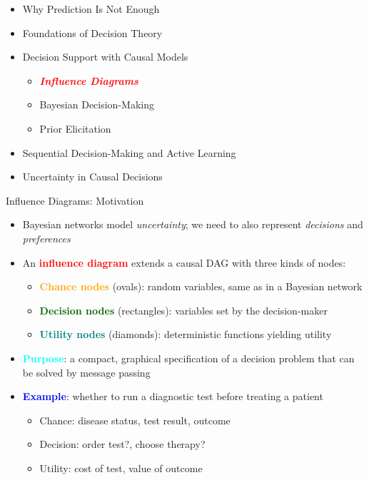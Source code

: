 \documentclass[
  10pt,
  ignorenonframetext,
]{beamer}
\providecommand{\tightlist}{%
  \setlength{\itemsep}{0pt}\setlength{\parskip}{0pt}}
\begin{document}
\begin{frame}{}
\label{section-9}
\begin{itemize}
\tightlist
\item
  Why Prediction Is Not Enough
\item
  Foundations of Decision Theory
\item
  Decision Support with Causal Models

  \begin{itemize}
  \tightlist
  \item
    \emph{\textbf{\textcolor{red}{Influence Diagrams}}}
  \item
    Bayesian Decision-Making
  \item
    Prior Elicitation
  \end{itemize}
\item
  Sequential Decision-Making and Active Learning
\item
  Uncertainty in Causal Decisions
\end{itemize}
\end{frame}

\begin{frame}{Influence Diagrams: Motivation}
\label{influence-diagrams-motivation}
\begin{itemize}
\item
  Bayesian networks model \emph{uncertainty}; we need to also represent
  \emph{decisions} and \emph{preferences}
\item
  An \textbf{\textcolor{red}{influence diagram}} extends a causal DAG
  with three kinds of nodes:

  \begin{itemize}
  \tightlist
  \item
    \textbf{\textcolor{orange}{Chance nodes}} (ovals): random variables,
    same as in a Bayesian network
  \item
    \textbf{\textcolor{darkgreen}{Decision nodes}} (rectangles):
    variables set by the decision-maker
  \item
    \textbf{\textcolor{teal}{Utility nodes}} (diamonds): deterministic
    functions yielding utility
  \end{itemize}
\item
  \textbf{\textcolor{cyan}{Purpose}}: a compact, graphical specification
  of a decision problem that can be solved by message passing
\item
  \textbf{\textcolor{blue}{Example}}: whether to run a diagnostic test
  before treating a patient

  \begin{itemize}
  \tightlist
  \item
    Chance: disease status, test result, outcome
  \item
    Decision: order test?, choose therapy?
  \item
    Utility: cost of test, value of outcome
  \end{itemize}
\end{itemize}
\end{frame}
\end{document}
